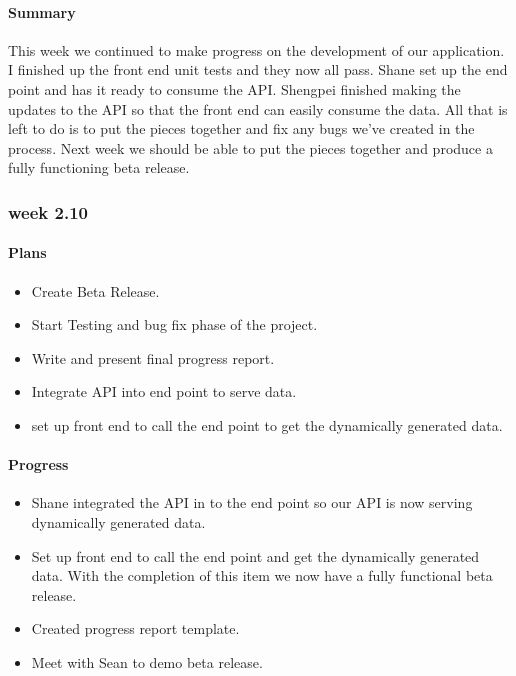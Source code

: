 \documentclass[onecolumn, draftclsnofoot,10pt, compsoc]{article}
\begin{document}
			\paragraph{Summary} \hfill \break
			This week we continued to make progress on the development of our application. I finished up the front end unit tests and they now all pass. Shane set up the end point and has it ready to consume the API. Shengpei finished making the updates to the API so that the front end can easily consume the data. All that is left to do is to put the pieces together and fix any bugs we've created in the process. Next week we should be able to put the pieces together and produce a fully functioning beta release.\\

		\subsubsection{week 2.10}
			\paragraph{Plans} \hfill \break
				\begin{itemize}
					\item Create Beta Release.
					\item Start Testing and bug fix phase of the project.
					\item Write and present final progress report.
					\item Integrate API into end point to serve data.
					\item set up front end to call the end point to get the dynamically generated data.
				\end{itemize}
			\paragraph{Progress} \hfill \break
				\begin{itemize}
					\item Shane integrated the API in to the end point so our API is now serving dynamically generated data.
					\item Set up front end to call the end point and get the dynamically generated data. With the completion of this item we now have a fully functional beta release.
					\item Created progress report template.
					\item Meet with Sean to demo beta release.
				\end{itemize}
\end{document}
